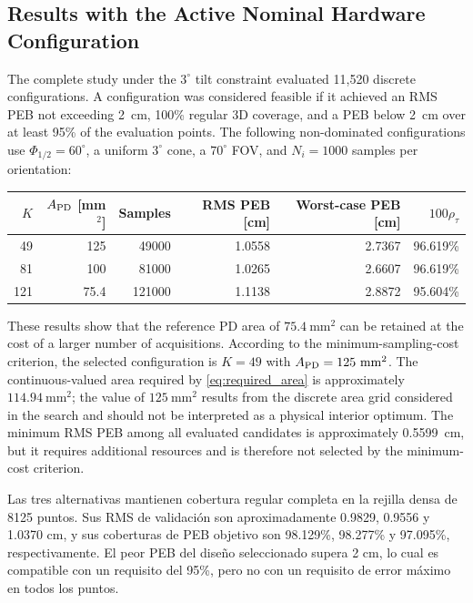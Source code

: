 \documentclass[11pt,a4paper]{article}
\begin{document}
\subsection{Results with the Active Nominal Hardware Configuration}

The complete study under the $3^\circ$ tilt constraint evaluated 11,520 discrete configurations. A configuration was considered feasible if it achieved an RMS PEB not exceeding 2~cm, 100\% regular 3D coverage, and a PEB below 2~cm over at least 95\% of the evaluation points. The following non-dominated configurations use $\Phi_{1/2}=60^\circ$, a uniform $3^\circ$ cone, a $70^\circ$ FOV, and $N_i=1000$ samples per orientation:

\begin{center}
\begin{tabular}{rrrrrr}
\toprule
$K$ & $A_{\rm PD}$ [mm$^2$] & Samples & RMS PEB [cm] & Worst-case PEB [cm] & $100\rho_\tau$ \\
\midrule
49  & 125  & 49000  & 1.0558 & 2.7367 & 96.619\% \\
81  & 100  & 81000  & 1.0265 & 2.6607 & 96.619\% \\
121 & 75.4 & 121000 & 1.1138 & 2.8872 & 95.604\% \\
\bottomrule
\end{tabular}
\end{center}

These results show that the reference PD area of $75.4\ \mathrm{mm}^2$ can be retained at the cost of a larger number of acquisitions. According to the minimum-sampling-cost criterion, the selected configuration is $K=49$ with $A_{\rm PD}=125\ \mathrm{mm}^2$. The continuous-valued area required by \eqref{eq:required_area} is approximately $114.94\ \mathrm{mm}^2$; the value of $125\ \mathrm{mm}^2$ results from the discrete area grid considered in the search and should not be interpreted as a physical interior optimum. The minimum RMS PEB among all evaluated candidates is approximately 0.5599~cm, but it requires additional resources and is therefore not selected by the minimum-cost criterion.

Las tres alternativas mantienen cobertura regular completa en la rejilla densa de 8125 puntos. Sus RMS de validación son aproximadamente 0.9829, 0.9556 y 1.0370 cm, y sus coberturas de PEB objetivo son 98.129\%, 98.277\% y 97.095\%, respectivamente. El peor PEB del diseño seleccionado supera 2 cm, lo cual es compatible con un requisito del 95\%, pero no con un requisito de error máximo en todos los puntos.
\end{document}
